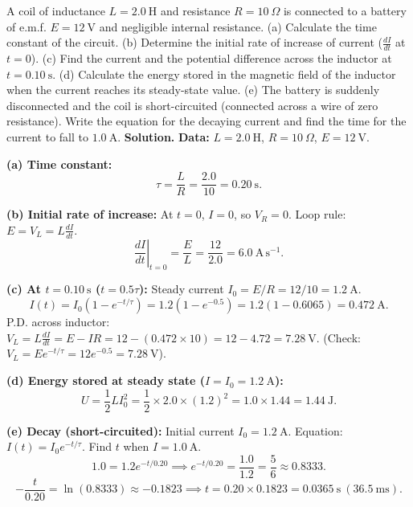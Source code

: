 \documentclass[11pt]{article}
\begin{document}
\begin{exoresolu}
A coil of inductance $L = 2.0\ \mathrm{H}$ and resistance $R = 10\ \Omega$ is connected to a battery of e.m.f. $E = 12\ \mathrm{V}$ and negligible internal resistance. (a) Calculate the time constant of the circuit. (b) Determine the initial rate of increase of current ($\frac{dI}{dt}$ at $t=0$). (c) Find the current and the potential difference across the inductor at $t = 0.10\ \mathrm{s}$. (d) Calculate the energy stored in the magnetic field of the inductor when the current reaches its steady-state value. (e) The battery is suddenly disconnected and the coil is short-circuited (connected across a wire of zero resistance). Write the equation for the decaying current and find the time for the current to fall to $1.0\ \mathrm{A}$.
\tcblower
\textbf{Solution.}
\textbf{Data:} $L=2.0\ \mathrm{H}$, $R=10\ \Omega$, $E=12\ \mathrm{V}$.

\textbf{(a) Time constant:}
\[
\tau = \frac{L}{R} = \frac{2.0}{10} = \boxed{0.20\ \mathrm{s}}.
\]

\textbf{(b) Initial rate of increase:} At $t=0$, $I=0$, so $V_R=0$. Loop rule: $E = V_L = L\frac{dI}{dt}$.
\[
\left.\frac{dI}{dt}\right|_{t=0} = \frac{E}{L} = \frac{12}{2.0} = \boxed{6.0\ \mathrm{A\,s^{-1}}}.
\]

\textbf{(c) At $t = 0.10\ \mathrm{s}$ ($t = 0.5\tau$):}
Steady current $I_0 = E/R = 12/10 = 1.2\ \mathrm{A}$.
\[
I(t) = I_0(1 - e^{-t/\tau}) = 1.2(1 - e^{-0.5}) = 1.2(1 - 0.6065) = \boxed{0.472\ \mathrm{A}}.
\]
P.D. across inductor: $V_L = L\frac{dI}{dt} = E - IR = 12 - (0.472 \times 10) = 12 - 4.72 = \boxed{7.28\ \mathrm{V}}$.
(Check: $V_L = E e^{-t/\tau} = 12 e^{-0.5} = 7.28\ \mathrm{V}$).

\textbf{(d) Energy stored at steady state ($I=I_0=1.2\ \mathrm{A}$):}
\[
U = \frac{1}{2} L I_0^2 = \frac{1}{2} \times 2.0 \times (1.2)^2 = 1.0 \times 1.44 = \boxed{1.44\ \mathrm{J}}.
\]

\textbf{(e) Decay (short-circuited):} Initial current $I_0 = 1.2\ \mathrm{A}$. Equation: $I(t) = I_0 e^{-t/\tau}$.
Find $t$ when $I = 1.0\ \mathrm{A}$.
\[
1.0 = 1.2 e^{-t/0.20} \implies e^{-t/0.20} = \frac{1.0}{1.2} = \frac{5}{6} \approx 0.8333.
\]
\[
-\frac{t}{0.20} = \ln(0.8333) \approx -0.1823 \implies t = 0.20 \times 0.1823 = \boxed{0.0365\ \mathrm{s}} \ (36.5\ \mathrm{ms}).
\]
\end{exoresolu}
\end{document}
